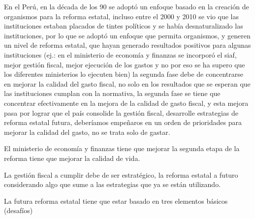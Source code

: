 \documentclass[
  a4paper,
]{article}
\begin{document}
En el Perú, en la década de los 90 se adoptó un enfoque basado en la
creación de organismos para la reforma estatal, incluso entre el 2000 y
2010 se vio que las instituciones estaban placados de tintes políticos y
se había desnaturalizado las instituciones, por lo que se adoptó un
enfoque que permita organismos, y generen un nivel de reforma estatal,
que hayan generado resultados positivos para algunas instituciones (ej.:
en el ministerio de economía y finanzas se incorporó el siaf, mejor
gestión fiscal, mejor ejecución de los gastos y no por eso se ha supero
que los diferentes ministerios lo ejecuten bien) la segunda fase debe de
concentrarse en mejorar la calidad del gasto fiscal, no solo en los
resultados que se esperan que las instituciones cumplan con la
normativa, la segunda fase se tiene que concentrar efectivamente en la
mejora de la calidad de gasto fiscal, y esta mejora pasa por lograr que
el país consolide la gestión fiscal, desarrolle estrategias de reforma
estatal futura, deberíamos empeñaros en un orden de prioridades para
mejorar la calidad del gasto, no se trata solo de gastar.

El ministerio de economía y finanzas tiene que mejorar la segunda etapa
de la reforma tiene que mejorar la calidad de vida.

La gestión fiscal a cumplir debe de ser estratégico, la reforma estatal
a futuro considerando algo que sume a las estrategias que ya se están
utilizando.

La futura reforma estatal tiene que estar basado en tres elementos
básicos (desafíos)
\end{document}
